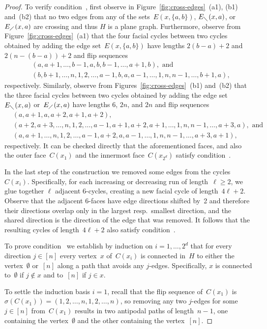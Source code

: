 \documentclass[a4paper,11pt,reqno]{amsart}
\begin{document}
\begin{proof}
To verify condition~, first observe in Figure~\ref{fig:cross-edges}~(a1), (b1) and~(b2) that no two edges from any of the sets~$E(x,\{a,b\})$, $E_{\diagdown}(x,a)$, or $E_{\diagup}(x,a)$ are crossing and thus $H$ is a plane graph.
Furthermore, observe from Figure~\ref{fig:cross-edges}~(a1) that the four facial cycles between two cycles obtained by adding the edge set~$E(x,\{a,b\})$ have lengths $2(b-a)+2$ and $2(n-(b-a))+2$ and flip sequences
\begin{align*}
   & (a,a+1,\ldots,b-1,a,b,b-1,\dots,a+1,b), \text{ and} \\
   & (b,b+1,\ldots,n,1,2,\dots,a-1,b,a,a-1,\ldots,1,n,n-1,\dots,b+1,a),
\end{align*}
respectively.
Similarly, observe from Figures~\ref{fig:cross-edges}~(b1) and~(b2) that the three facial cycles between two cycles obtained by adding the edge set~$E_{\diagdown}(x,a)$ or~$E_{\diagup}(x,a)$ have lengths 6, $2n$, and $2n$ and flip sequences
\begin{align*}
   & (a,a+1,a,a+2,a+1,a+2), \\
   & (a+2,a+3,\ldots,n,1,2,\ldots,a-1,a+1,a+2,a+1,\dots,1,n,n-1,\ldots,a+3,a), \text{ and} \\
   & (a,a+1,\ldots,n,1,2,\ldots,a-1,a+2,a,a-1,\ldots,1,n,n-1,\dots,a+3,a+1),
\end{align*}
respectively.
It can be checked directly that the aforementioned faces, and also the outer face~$C(x_1)$ and the innermost face~$C(x_{2^d})$ satisfy condition~.

In the last step of the construction we removed some edges from the cycles~$C(x_i)$.
Specifically, for each increasing or decreasing run of length~$\ell\geq 2$, we glue together $\ell$ adjacent 6-cycles, creating a new facial cycle of length~$4\ell+2$.
Observe that the adjacent 6-faces have edge directions shifted by~2 and therefore their directions overlap only in the largest resp.\ smallest direction, and the shared direction is the direction of the edge that was removed.
It follows that the resulting cycles of length~$4\ell+2$ also satisfy condition~.

To prove condition~ we establish by induction on $i=1,\dots,2^d$ that for every direction $j\in [n]$ every vertex~$x$ of~$C(x_i)$ is connected in~$H$ to either the vertex~$\emptyset$ or~$[n]$ along a path that avoids any $j$-edges.
Specifically, $x$ is connected to~$\emptyset$ if $j\notin x$ and to~$[n]$ if $j\in x$.

To settle the induction basis $i=1$, recall that the flip sequence of~$C(x_1)$ is $\sigma(C(x_1))=(1,2,\ldots,n,1,2,\ldots,n)$, so removing any two $j$-edges for some $j\in[n]$ from~$C(x_1)$ results in two antipodal paths of length~$n-1$, one containing the vertex~$\emptyset$ and the other containing the vertex~$[n]$.


\end{proof}
\end{document}
